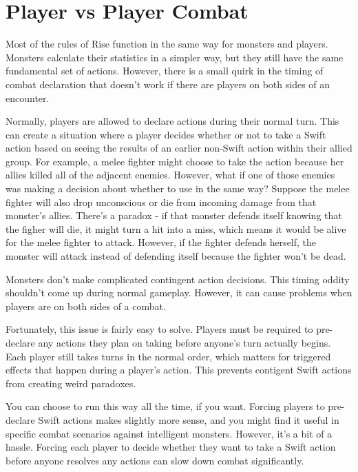 \section{Player vs Player Combat}
  Most of the rules of Rise function in the same way for monsters and players.
  Monsters calculate their statistics in a simpler way, but they still have the same fundamental set of actions.
  However, there is a small quirk in the timing of combat declaration that doesn't work if there are players on both sides of an encounter.

  Normally, players are allowed to declare  actions during their normal turn.
  This can create a situation where a player decides whether or not to take a Swift action based on seeing the results of an earlier non-Swift action within their allied group.
  For example, a melee fighter might choose to take the  action because her allies killed all of the adjacent enemies.
  However, what if one of those enemies was making a decision about whether to use  in the same way?
  Suppose the melee fighter will also drop unconscious or die from incoming damage from that monster's allies.
  There's a paradox - if that monster defends itself knowing that the figher will die, it might turn a hit into a miss, which means it would be alive for the melee fighter to attack.
  However, if the fighter defends herself, the monster will attack instead of defending itself because the fighter won't be dead.

  Monsters don't make complicated contingent action decisions.
  This timing oddity shouldn't come up during normal gameplay.
  However, it can cause problems when players are on both sides of a combat.

  Fortunately, this issue is fairly easy to solve.
  Players must be required to pre-declare any  actions they plan on taking before anyone's turn actually begins.
  Each player still takes turns in the normal order, which matters for triggered effects that happen during a player's action.
  This prevents contigent Swift actions from creating weird paradoxes.

  You can choose to run this way all the time, if you want.
  Forcing players to pre-declare Swift actions makes slightly more sense, and you might find it useful in specific combat scenarios against intelligent monsters.
  However, it's a bit of a hassle.
  Forcing each player to decide whether they want to take a Swift action before anyone resolves any actions can slow down combat significantly.
